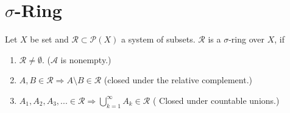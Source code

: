 \section{\(\sigma\)-Ring}
\begin{definition}
    Let \(X\) be set and \(\mathcal{R} \subset \mathcal{P}(X)\) a system of subsets. \(\mathcal{R}\) is a \(\sigma\)-ring over \(X\), if
        \begin{enumerate}
            \item \(\mathcal{R} \neq \emptyset\). (\(\mathcal{A}\) is {\color{mathrem}nonempty.})
            \item \(A, B \in \mathcal{R} \Rightarrow A \setminus B \in \mathcal{R}\) ({\color{mathrem}closed under the relative complement}.)
            \item \(A_1, A_2, A_3, ... \in \mathcal{R} \Rightarrow \bigcup_{k=1}^\infty A_k \in \mathcal{R}\) ({\color{mathrem} Closed under countable unions.})
        \end{enumerate}
\end{definition}
%
%
%
%
%
